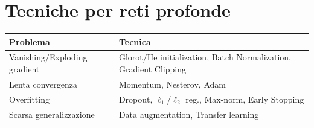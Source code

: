 \section{Tecniche per reti profonde}

\begin{center}
\renewcommand{\arraystretch}{1.3}
\begin{tabular}{@{} p{3.2cm} p{5.2cm} @{}}
\toprule
\textbf{Problema} & \textbf{Tecnica} \\
\midrule
Vanishing/Exploding gradient & Glorot/He initialization, Batch Normalization, Gradient Clipping \\
Lenta convergenza & Momentum, Nesterov, Adam \\
Overfitting & Dropout, $\ell_1$/$\ell_2$ reg., Max-norm, Early Stopping \\
Scarsa generalizzazione & Data augmentation, Transfer learning \\
\bottomrule
\end{tabular}
\end{center}